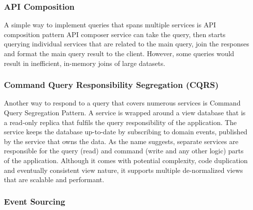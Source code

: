\documentclass{Configuration_Files/PoliMi3i_thesis}
\begin{document}
\subsubsection{API Composition}
\label{subsubsec:api_comp}

A simple way to implement queries that spans multiple services is API composition pattern
API composer service can take the query, then starts querying individual services that are related to the main query, join the responses and format the main query result to the client.
However, some queries would result in inefficient, in-memory joins of large datasets.

\subsubsection{Command Query Responsibility Segregation (CQRS)}
\label{subsubsec:cqrs}

Another way to respond to a query that covers numerous services is Command Query Segregation Pattern.
A service is wrapped around a view database that is a read-only replica that fulfils the query responsibility of the application.
The service keeps the database up-to-date by subscribing to domain events, published by the service that owns the data.
As the name suggests, separate services are responsible for the query (read) and command (write and any other logic) parts of the application.
Although it comes with potential complexity, code duplication and eventually consistent view nature, it supports multiple de-normalized views that are scalable and performant.

\subsubsection{Event Sourcing}
\label{subsubsec:event_sourcing}
\end{document}
